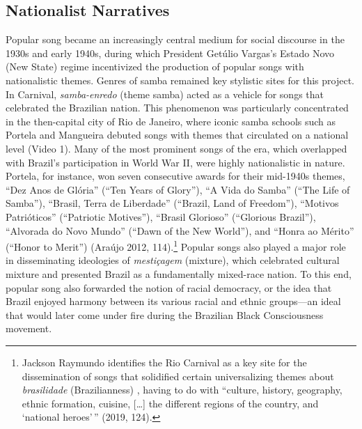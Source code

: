 \documentclass[twoside]{article}
\begin{document}
\hypertarget{nationalist-narratives}{%
\subsection*{Nationalist Narratives}\label{nationalist-narratives}}

Popular song became an increasingly central medium for social discourse
in the 1930s and early 1940s, during which President Getúlio Vargas's
Estado Novo (New State) regime incentivized the production of popular
songs with nationalistic themes. Genres of samba remained key stylistic
sites for this project. In Carnival, \emph{samba-enredo} (theme samba)
acted as a vehicle for songs that celebrated the Brazilian nation. This
phenomenon was particularly concentrated in the then-capital city of Rio
de Janeiro, where iconic samba schools such as Portela and Mangueira
debuted songs with themes that circulated on a national level (Video 1).
Many of the most prominent songs of the era, which overlapped with
Brazil's participation in World War II, were highly nationalistic in
nature. Portela, for instance, won seven consecutive awards for their
mid-1940s themes, ``Dez Anos de Glória'' (``Ten Years of Glory''), ``A
Vida do Samba'' (``The Life of Samba''), ``Brasil, Terra de Liberdade''
(``Brazil, Land of Freedom''), ``Motivos Patrióticos'' (``Patriotic
Motives''), ``Brasil Glorioso'' (``Glorious Brazil''), ``Alvorada do
Novo Mundo'' (``Dawn of the New World''), and ``Honra ao Mérito''
(``Honor to Merit'') (Araújo 2012, 114).\footnote{Jackson Raymundo
  identifies the Rio Carnival as a key site for the dissemination of
  songs that solidified certain universalizing themes about
  \emph{brasilidade} (Brazilianness) , having to do with ``culture,
  history, geography, ethnic formation, cuisine, {[}\ldots{]} the
  different regions of the country, and `national heroes'\,'' (2019,
  124).} Popular songs also played a major role in disseminating
ideologies of \emph{mestiçagem} (mixture), which celebrated cultural
mixture and presented Brazil as a fundamentally mixed-race nation. To
this end, popular song also forwarded the notion of racial democracy, or
the idea that Brazil enjoyed harmony between its various racial and
ethnic groups---an ideal that would later come under fire during the
Brazilian Black Consciousness movement.
\end{document}
